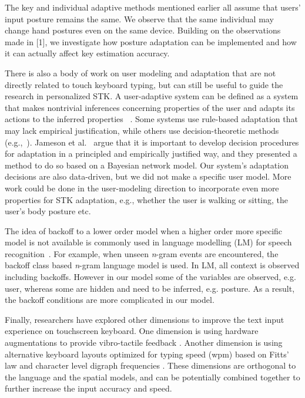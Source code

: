 \documentclass{sigchi}
\begin{document}
The key and individual adaptive methods mentioned earlier all assume that users' input posture
remains the same. We observe that the same individual may change hand postures even on the same device. Building on the observations made in [1], we investigate how posture adaptation can be implemented and how it can actually affect key estimation accuracy.

There is also a body of work on user modeling and adaptation that are not
directly related to touch keyboard typing, but can
still be useful to guide the research in personalized STK. A
user-adaptive system can be defined as a system that makes
nontrivial inferences concerning properties of the user and adapts its actions
to the inferred properties ~\cite{Jameson:2000}. Some systems use rule-based
adaptation that may lack empirical justification, while others use 
decision-theoretic methods (e.g.,~\cite{Jameson:1998}). Jameson et al.~\cite{Jameson:2000} argue that it is important to develop decision procedures for adaptation in a principled and
empirically justified way, and they presented a method to do so based on a
Bayesian network model. Our system's adaptation decisions are also data-driven,
but we did not make a specific user model. More work could be done in the
user-modeling direction to incorporate even more properties for
STK adaptation, e.g., whether the user is walking or sitting, the user's body
posture etc.

The idea of backoff to a lower order model when a higher order more specific 
model is not available is commonly used in language modelling (LM) for speech 
recognition~\cite{Katz:1987, Zitouni:2007}. For example, when unseen 
\textit{n}-gram events are encountered, the backoff class based \textit{n}-gram 
language model is used.  In LM,  all context is observed including backoffs. 
However in our model some of the variables are observed, e.g. user, whereas some
are hidden and need to be inferred, e.g. posture. As a result, the backoff 
conditions are more complicated in our model.

Finally, researchers have explored other dimensions to improve the 
text input experience on touchscreen keyboard. One dimension is using hardware
augmentations to provide vibro-tactile feedback \cite{Brewster:2007, Hoggan:2008}. 
Another dimension is using alternative keyboard layouts optimized for typing speed (wpm)
based on Fitts' law and character level digraph frequencies \cite{Zhai:2000, MacKenzie:1999}.
These dimensions are orthogonal to the language and the spatial models, and can be potentially 
combined together to further increase the input accuracy and speed.
\end{document}
